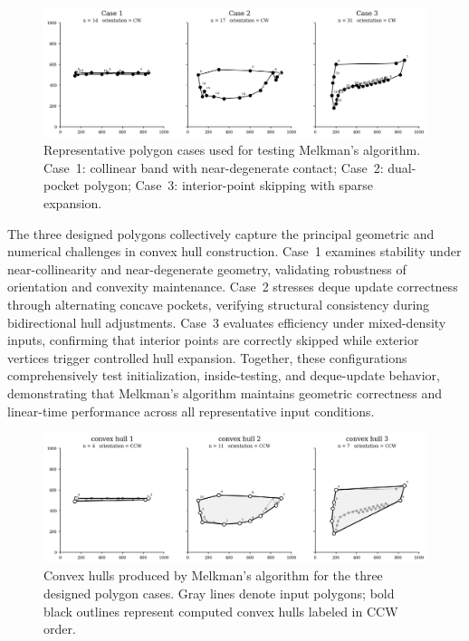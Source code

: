 \documentclass{article}
\begin{document}

\begin{figure}[H]
    \centering
    \includegraphics[width=0.9\linewidth]{Pictures/polygon_cases.png}
    \caption{Representative polygon cases used for testing Melkman’s algorithm. 
    Case~1: collinear band with near-degenerate contact; 
    Case~2: dual-pocket polygon; 
    Case~3: interior-point skipping with sparse expansion.}
\end{figure}

The three designed polygons collectively capture the principal geometric and numerical challenges in convex hull construction.  
Case~1 examines stability under near-collinearity and near-degenerate geometry, validating robustness of orientation and convexity maintenance.  
Case~2 stresses deque update correctness through alternating concave pockets, verifying structural consistency during bidirectional hull adjustments.  
Case~3 evaluates efficiency under mixed-density inputs, confirming that interior points are correctly skipped while exterior vertices trigger controlled hull expansion.  
Together, these configurations comprehensively test initialization, inside-testing, and deque-update behavior, demonstrating that Melkman’s algorithm maintains geometric correctness and linear-time performance across all representative input conditions.


\begin{figure}[H]
    \centering
    \includegraphics[width=0.95\linewidth]{Pictures/hulls.png}
    \caption{Convex hulls produced by Melkman’s algorithm for the three designed polygon cases. 
    Gray lines denote input polygons; bold black outlines represent computed convex hulls labeled in CCW order.}
    \label{fig:hulls}
\end{figure}
\end{document}
